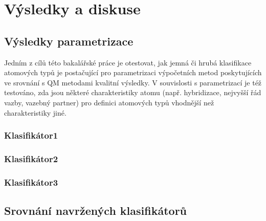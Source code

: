 \chapter{Výsledky a diskuse}
\section{Výsledky parametrizace}
Jedním z cílů této bakalářské práce je otestovat, jak jemná či hrubá klasifikace atomových typů je postačující pro parametrizaci výpočetních metod poskytujících ve srovnání s QM metodami kvalitní výsledky. V souvislosti s parametrizací je též testováno, zda jsou některé charakteristiky atomu (např. hybridizace, nejvyšší řád vazby, vazebný partner) pro definici atomových typů vhodnější než charakteristiky jiné. 
\subsection{Klasifikátor1}
\subsection{Klasifikátor2}
\subsection{Klasifikátor3}
\section{Srovnání navržených klasifikátorů}